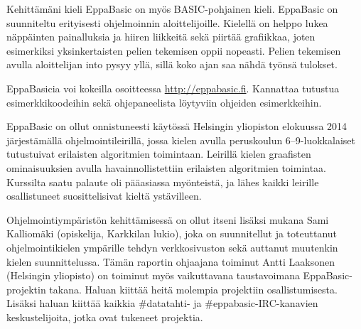Kehittämäni kieli EppaBasic
on myös
BASIC-pohjainen kieli.
EppaBasic on suunniteltu
erityisesti ohjelmoinnin aloittelijoille.
Kielellä on helppo lukea
näppäinten painalluksia
ja hiiren liikkeitä
sekä piirtää grafiikkaa,
joten esimerkiksi yksinkertaisten
pelien tekemisen oppii nopeasti.
Pelien tekemisen avulla aloittelijan into pysyy yllä,
sillä koko ajan saa nähdä työnsä tulokset.

EppaBasicia voi kokeilla osoitteessa
\url{http://eppabasic.fi}.
Kannattaa tutustua esimerkkikoodeihin
sekä ohjepaneelista löytyviin
ohjeiden esimerkkeihin.

EppaBasic on ollut onnistuneesti käytössä
Helsingin yliopiston elokuussa 2014
järjestämällä ohjelmointileirillä,
jossa kielen avulla peruskoulun
6--9-luokkalaiset
tutustuivat erilaisten algoritmien toimintaan.
Leirillä kielen graafisten ominaisuuksien
avulla havainnollistettiin erilaisten
algoritmien toimintaa.
Kurssilta saatu palaute oli pääasiassa myönteistä,
ja lähes kaikki leirille osallistuneet
suosittelisivat kieltä ystävilleen.

Ohjelmointiympäristön kehittämisessä on
ollut itseni lisäksi mukana
Sami Kalliomäki (opiskelija, Karkkilan lukio),
joka on suunnitellut ja toteuttanut
ohjelmointikielen ympärille tehdyn verkkosivuston
sekä auttanut muutenkin kielen suunnittelussa.
Tämän raportin ohjaajana toiminut
Antti Laaksonen (Helsingin yliopisto)
on toiminut myös vaikuttavana
taustavoimana EppaBasic-projektin takana.
Haluan kiittää heitä molempia
projektiin osallistumisesta.
Lisäksi haluan kiittää kaikkia
\#datatahti- ja
\#eppabasic-IRC-kanavien keskustelijoita,
jotka ovat tukeneet projektia.